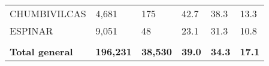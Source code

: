 \begin{tabular}{llllll}
	\cellcolor[HTML]{F8CBAD}CHUMBIVILCAS                           & 4,681                                                                 & 175                                                              & 42.7                                                                             & 38.3                                                                        & 13.3                                                                                \\
	\cellcolor[HTML]{F8CBAD}ESPINAR                                & 9,051                                                                 & 48                                                               & 23.1                                                                             & 31.3                                                                        & 10.8                                                                                \\
	&                                                                       &                                                                  &                                                                                  &                                                                             &                                                                                     \\
	\rowcolor[HTML]{DDEBF7} 
	\textbf{Total   general}                                       & \textbf{196,231}                                                      & \textbf{38,530}                                                  & \textbf{39.0}                                                                    & \textbf{34.3}                                                               & \textbf{17.1}                                                                      
\end{tabular}